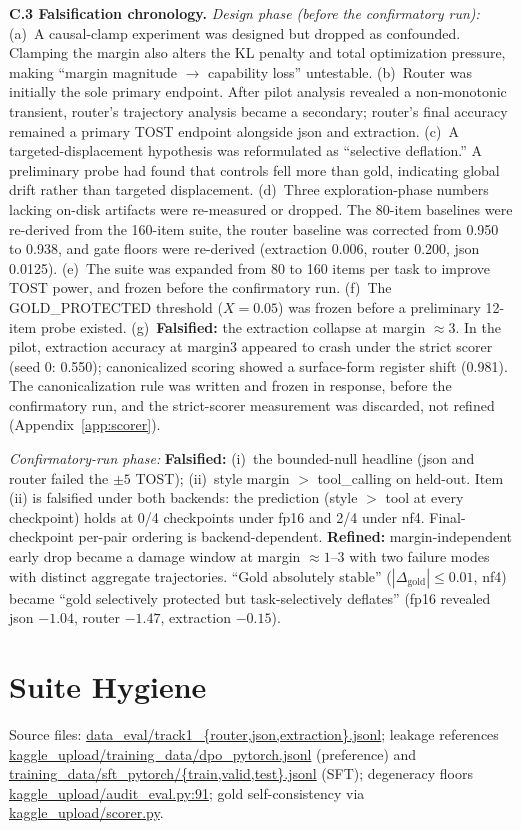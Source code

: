 \textbf{C.3 Falsification chronology.} \emph{Design phase (before the confirmatory run):} (a)~A causal-clamp experiment was designed but dropped as confounded. Clamping the margin also alters the KL penalty and total optimization pressure, making ``margin magnitude $\to$ capability loss'' untestable. (b)~Router was initially the sole primary endpoint. After pilot analysis revealed a non-monotonic transient, router's trajectory analysis became a secondary; router's final accuracy remained a primary TOST endpoint alongside json and extraction. (c)~A targeted-displacement hypothesis was reformulated as ``selective deflation.'' A preliminary probe had found that controls fell more than gold, indicating global drift rather than targeted displacement. (d)~Three exploration-phase numbers lacking on-disk artifacts were re-measured or dropped. The 80-item baselines were re-derived from the 160-item suite, the router baseline was corrected from 0.950 to 0.938, and gate floors were re-derived (extraction 0.006, router 0.200, json 0.0125). (e)~The suite was expanded from 80 to 160 items per task to improve TOST power, and frozen before the confirmatory run. (f)~The GOLD\_PROTECTED threshold ($X = 0.05$) was frozen before a preliminary 12-item probe existed. (g)~\textbf{Falsified:} the extraction collapse at margin ${\approx}3$. In the pilot, extraction accuracy at margin3 appeared to crash under the strict scorer (seed 0: 0.550); canonicalized scoring showed a surface-form register shift (0.981). The canonicalization rule was written and frozen in response, before the confirmatory run, and the strict-scorer measurement was discarded, not refined (Appendix~\ref{app:scorer}).

\emph{Confirmatory-run phase:} \textbf{Falsified:} (i)~the bounded-null headline (json and router failed the $\pm5$ TOST); (ii)~style margin $>$ tool\_calling on held-out. Item (ii) is falsified under both backends: the prediction (style $>$ tool at every checkpoint) holds at 0/4 checkpoints under fp16 and 2/4 under nf4. Final-checkpoint per-pair ordering is backend-dependent. \textbf{Refined:} margin-independent early drop became a damage window at margin ${\approx}1$--3 with two failure modes with distinct aggregate trajectories. ``Gold absolutely stable'' ($|\Delta_{\text{gold}}| \le 0.01$, nf4) became ``gold selectively protected but task-selectively deflates'' (fp16 revealed json $-1.04$, router $-1.47$, extraction $-0.15$).

\section{Suite Hygiene}
\label{app:hygiene}
Source files: \url{data_eval/track1_{router,json,extraction}.jsonl}; leakage references \url{kaggle_upload/training_data/dpo_pytorch.jsonl} (preference) and \url{training_data/sft_pytorch/{train,valid,test}.jsonl} (SFT); degeneracy floors \url{kaggle_upload/audit_eval.py:91}; gold self-consistency via \url{kaggle_upload/scorer.py}.

